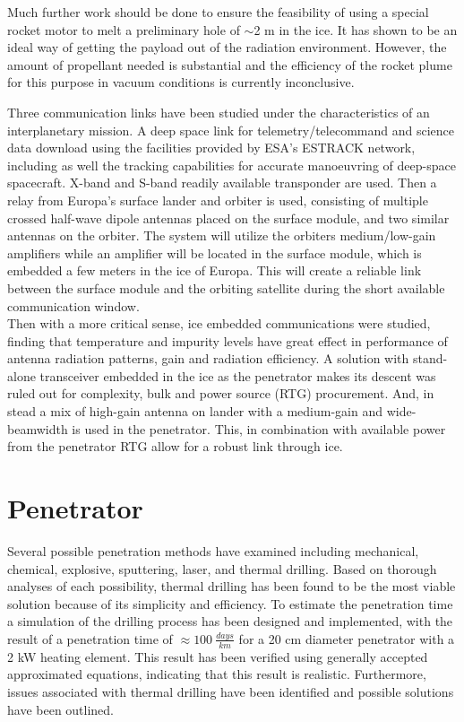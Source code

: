 Much further work should be done to ensure the feasibility of using a special rocket motor to melt a preliminary hole of $\sim$2 m in the ice. It has shown to be an ideal way of getting the payload out of the radiation environment. However, the amount of propellant needed is substantial and the efficiency of the rocket plume for this purpose in vacuum conditions is currently inconclusive.


Three communication links have been studied under the characteristics of an interplanetary mission. A deep space link for telemetry/telecommand and science data download using the facilities provided by ESA's ESTRACK network, including as well the tracking capabilities for accurate manoeuvring of deep-space spacecraft. X-band and S-band readily available transponder are used. Then a relay from Europa's surface lander and orbiter is used, consisting of multiple crossed half-wave dipole antennas placed on the surface module, and two similar antennas on the orbiter. The system will utilize the orbiters medium/low-gain amplifiers while an amplifier will be located in the surface module, which is embedded a few meters in the ice of Europa. This will create a reliable link between the surface module and the orbiting satellite during the short available communication window.
\\
Then with a more critical sense, ice embedded communications were studied, finding that temperature and impurity levels have great effect in performance of antenna radiation patterns, gain and radiation efficiency. A solution with stand-alone transceiver embedded in the ice as the penetrator makes its descent was ruled out for complexity, bulk and power source (RTG) procurement. And, in stead a mix of high-gain antenna on lander with a medium-gain and wide-beamwidth is used in the penetrator. This, in combination with available power from the penetrator RTG allow for a robust link through ice.
 



\section{Penetrator}
Several possible penetration methods have examined including mechanical, chemical, explosive, sputtering, laser, and thermal drilling. Based on thorough analyses of each possibility, thermal drilling has been found to be the most viable solution because of its simplicity and efficiency. To estimate the penetration time a simulation of the drilling process has been designed and implemented, with the result of a penetration time of $\approx \SI{100}{\frac{days}{km}}$ for a 20 cm diameter penetrator with a 2 kW heating element. This result has been verified using generally accepted approximated equations, indicating that this result is realistic. Furthermore, issues associated with thermal drilling have been identified and possible solutions have been outlined.

